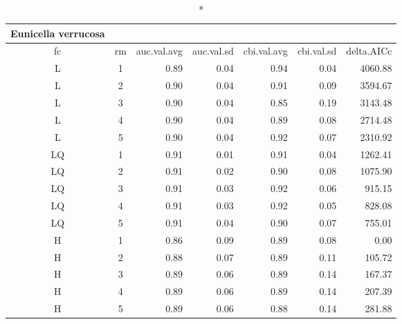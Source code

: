 \captionsetup[table]{labelformat=empty,skip=1pt}
\begin{longtable}{ccrrrrr}
\caption*{
{\large Eunicella verrucosa}
} \\ 
\toprule
fc & rm & auc.val.avg & auc.val.sd & cbi.val.avg & cbi.val.sd & delta.AICc \\ 
\midrule
L & 1 & 0.89 & 0.04 & 0.94 & 0.04 & 4060.88 \\ 
L & 2 & 0.90 & 0.04 & 0.91 & 0.09 & 3594.67 \\ 
L & 3 & 0.90 & 0.04 & 0.85 & 0.19 & 3143.48 \\ 
L & 4 & 0.90 & 0.04 & 0.89 & 0.08 & 2714.48 \\ 
L & 5 & 0.90 & 0.04 & 0.92 & 0.07 & 2310.92 \\ 
LQ & 1 & 0.91 & 0.01 & 0.91 & 0.04 & 1262.41 \\ 
LQ & 2 & 0.91 & 0.02 & 0.90 & 0.08 & 1075.90 \\ 
LQ & 3 & 0.91 & 0.03 & 0.92 & 0.06 & 915.15 \\ 
LQ & 4 & 0.91 & 0.03 & 0.92 & 0.05 & 828.08 \\ 
LQ & 5 & 0.91 & 0.04 & 0.90 & 0.07 & 755.01 \\ 
H & 1 & 0.86 & 0.09 & 0.89 & 0.08 & 0.00 \\ 
H & 2 & 0.88 & 0.07 & 0.89 & 0.11 & 105.72 \\ 
H & 3 & 0.89 & 0.06 & 0.89 & 0.14 & 167.37 \\ 
H & 4 & 0.89 & 0.06 & 0.89 & 0.14 & 207.39 \\ 
H & 5 & 0.89 & 0.06 & 0.88 & 0.14 & 281.88 \\ 
 \bottomrule
\end{longtable}

